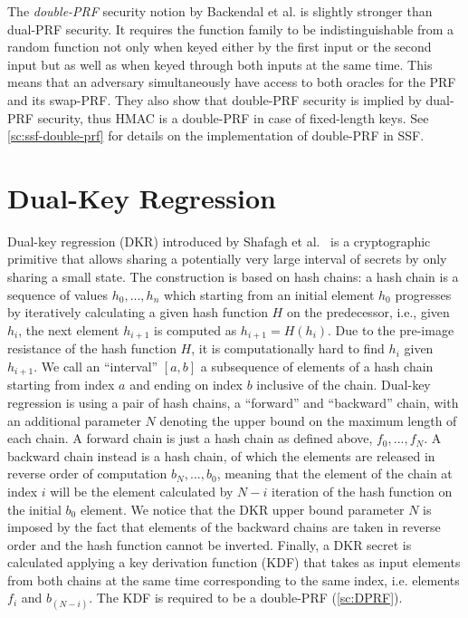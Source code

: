 The \textit{double-PRF} security notion by Backendal et al.
is slightly stronger than dual-PRF security.
It requires the function family to be indistinguishable from a random 
function not only when keyed either by the first input or the second input
but as well as when keyed through both inputs at the same time.
This means that an adversary simultaneously have access to both 
oracles for the PRF and its swap-PRF.
They also show that double-PRF security is implied by dual-PRF security,
thus HMAC is a double-PRF in case of fixed-length keys.
See \cref{sc:ssf-double-prf} for details on the implementation of double-PRF in SSF.

\section{Dual-Key Regression}\label{sc:DKR}

Dual-key regression (DKR) introduced by Shafagh et al.~\cite{USENIX:SBRH20} is a
cryptographic primitive that allows sharing a potentially very large interval 
of secrets by only sharing a small state.
The construction is based on hash chains: a hash chain is a sequence of values
$h_{0}, ..., h_{n}$ which starting from an initial
element $h_0$ progresses by iteratively calculating
a given hash function $H$ on the predecessor,
i.e., given $h_i$, the next element $h_{i+1}$ is computed as $h_{i+1} = H(h_i)$.
Due to the pre-image resistance of the hash function $H$, 
it is computationally hard to find $h_i$ given $h_{i+1}$.
We call an ``interval'' $[a, b]$ a subsequence of elements
of a hash chain starting from index $a$ and ending
on index $b$ inclusive of the chain.  
Dual-key regression is using a pair of hash chains,
a ``forward'' and ``backward'' chain, with an additional
parameter $N$ denoting the
upper bound on the maximum length of each chain.
A forward chain is just a hash chain as defined
above, $f_{0}, ..., f_{N}$.
A backward chain instead is a hash chain, of which the
elements are released in reverse order of computation
$b_{N}, ..., b_{0}$, meaning that the element of the chain 
at index $i$ will be the element calculated by $N - i$
iteration of the hash function on the initial $b_{0}$
element. We notice that the DKR upper bound parameter
$N$ is imposed by the
fact that elements of the backward chains are taken in
reverse order and the hash function cannot be inverted.
Finally, a DKR secret is calculated applying
a key derivation function (KDF) that takes
as input elements from both chains at the same
time corresponding to the same index, i.e.\!
elements $f_{i}$ and $b_{(N - i)}$.
The KDF is required to be a double-PRF (\cref{sc:DPRF}).

